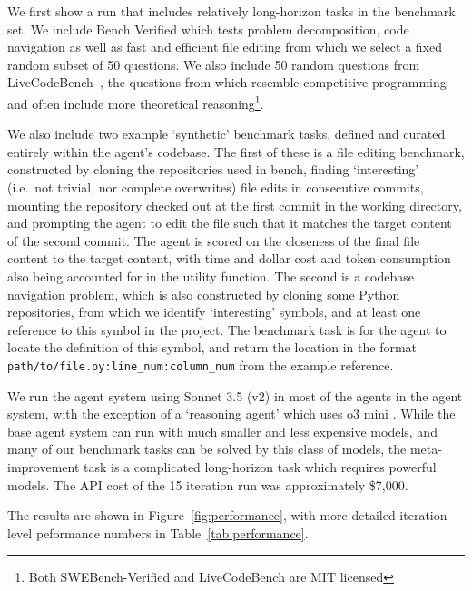 We first show a run that includes relatively long-horizon tasks in the benchmark
set. We include  Bench Verified
\citep{chowdhuryIntroducingSWEbenchVerified2024} which tests problem
decomposition, code navigation as well as fast and efficient file editing from
which we select a fixed random subset of 50 questions. We also include 50 random
questions from LiveCodeBench~\citep{jain2024livecodebench}, the questions from
which resemble competitive programming and often include more theoretical
reasoning\footnote{Both SWEBench-Verified and LiveCodeBench are MIT licensed}.

We also include two example `synthetic' benchmark tasks, defined and curated
entirely within the agent's codebase. The first of these is a file editing
benchmark, constructed by cloning the repositories used in  bench,
finding `interesting' (i.e.~not trivial, nor complete overwrites) file edits in
consecutive commits, mounting the repository checked out at the first commit in
the working directory, and prompting the agent to edit the file such that it
matches the target content of the second commit. The agent is scored on the
closeness of the final file content to the target content, with time and dollar
cost and token consumption also being accounted for in the utility function.
The second is a codebase navigation problem, which is also constructed by
cloning some Python repositories, from which we identify `interesting' symbols,
and at least one reference to this symbol in the project. The benchmark task is
for the agent to locate the definition of this symbol, and return the location
in the format \texttt{path/to/file.py:line\_num:column\_num} from the example
reference.

We run the agent system using Sonnet 3.5 (v2)
\citep{anthropicIntroducingClaude35} in most of the agents in the agent system,
with the exception of a `reasoning agent' which uses o3 mini
\citep{openaiOpenAIO3mini2025}. While the base agent system can run with much
smaller and less expensive models, and many of our benchmark tasks can be solved
by this class of models, the
meta-improvement task is a complicated long-horizon task which requires powerful
models. The API cost of the 15 iteration run was approximately \$7,000.

The results are shown in Figure~\ref{fig:performance}, with more detailed
iteration-level peformance numbers in Table~\ref{tab:performance}.

